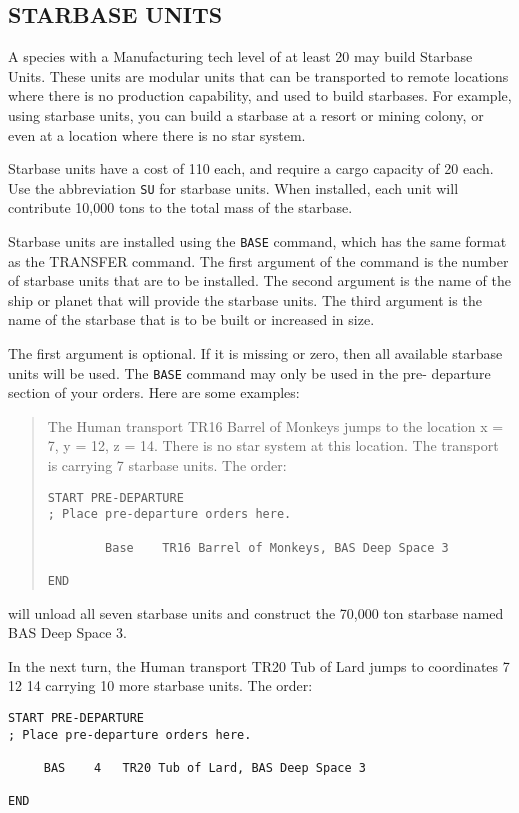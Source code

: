 \documentclass[10pt,titlepage]{article}
\begin{document}
\subsection{STARBASE UNITS}

A species with a Manufacturing tech level of at least 20 may build Starbase
Units.  These units are modular units that can be transported to remote
locations where there is no production capability, and used to build starbases.
For example, using starbase units, you can build a starbase at a resort or
mining colony, or even at a location where there is no star system.

Starbase units have a cost of 110 each, and require a cargo capacity of 20
each.  Use the abbreviation \texttt{SU} for starbase units.  When installed, each
unit will contribute 10,000 tons to the total mass of the starbase.

Starbase units are installed using the \texttt{BASE} command, which has the same format
as the TRANSFER command.  The first argument of the command is the number of
starbase units that are to be installed.  The second argument is the name of
the ship or planet that will provide the starbase units.  The third argument
is the name of the starbase that is to be built or increased in size.

The first argument is optional.  If it is missing or zero, then all available
starbase units will be used.  The \texttt{BASE} command may only be used in the pre-
departure section of your orders.  Here are some examples:
\begin{quotation}
\noindent The Human transport TR16 Barrel of Monkeys jumps to the location x = 7,
y = 12, z = 14.  There is no star system at this location.  The transport is
carrying 7 starbase units.  The order:

\begin{verbatim}
START PRE-DEPARTURE
; Place pre-departure orders here.

        Base    TR16 Barrel of Monkeys, BAS Deep Space 3

END\end{verbatim} 
\end{quotation}

will unload all seven starbase units and construct the 70,000 ton starbase
named BAS Deep Space 3.

In the next turn, the Human transport TR20 Tub of Lard jumps to coordinates
7 12 14 carrying 10 more starbase units.  The order:

\begin{verbatim}
START PRE-DEPARTURE
; Place pre-departure orders here.

     BAS	4	TR20 Tub of Lard, BAS Deep Space 3

END\end{verbatim} 
\end{document}
